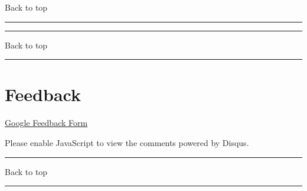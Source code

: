 \documentclass[
]{article}
\renewcommand{\linethickness}{0.05em}
\begin{document}
Back to top

\begin{center}\rule{0.5\linewidth}{\linethickness}\end{center}

\pagebreak

\begin{center}\rule{0.5\linewidth}{\linethickness}\end{center}

Back to top

\begin{center}\rule{0.5\linewidth}{\linethickness}\end{center}

\pagebreak

\hypertarget{feedback}{%
\section{Feedback}\label{feedback}}

\href{https://docs.google.com/forms/d/e/1FAIpQLSeD3Z9J6Y7eMmiyM12f_SfAmHUlykb1zxZcwO6lg7cebGYQIQ/viewform}{Google
Feedback Form}

\hypertarget{disqus_thread}{}

Please enable JavaScript to view the comments powered by Disqus.

\begin{center}\rule{0.5\linewidth}{\linethickness}\end{center}

Back to top

\begin{center}\rule{0.5\linewidth}{\linethickness}\end{center}

\pagebreak
\end{document}
